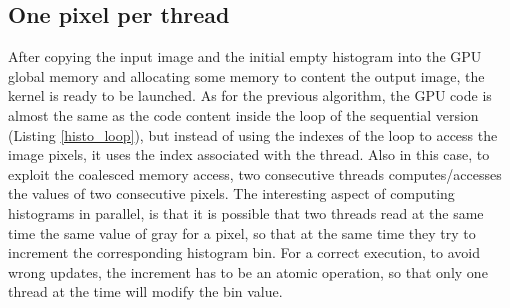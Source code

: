 \documentclass[a4paper]{article}
\begin{document}
\subsection{One pixel per thread}
\label{sec:fm2}
After copying the input image and the initial empty histogram into the GPU global memory and allocating some memory to content the output image, the kernel is ready to be launched. As for the previous algorithm, the GPU code is almost the same as the code content inside the loop of the sequential version (Listing \ref{histo_loop}), but instead of using the indexes of the loop to access the image pixels, it uses the index associated with the thread. Also in this case, to exploit the coalesced memory access, two consecutive threads computes/accesses the values of two consecutive pixels. The interesting aspect of computing histograms in parallel, is that it is possible that two threads read at the same time the same value of gray for a pixel, so that at the same time they try to increment the corresponding histogram bin. For a correct execution, to avoid wrong updates, the increment has to be an atomic operation, so that only one thread at the time will modify the bin value. 
\end{document}
